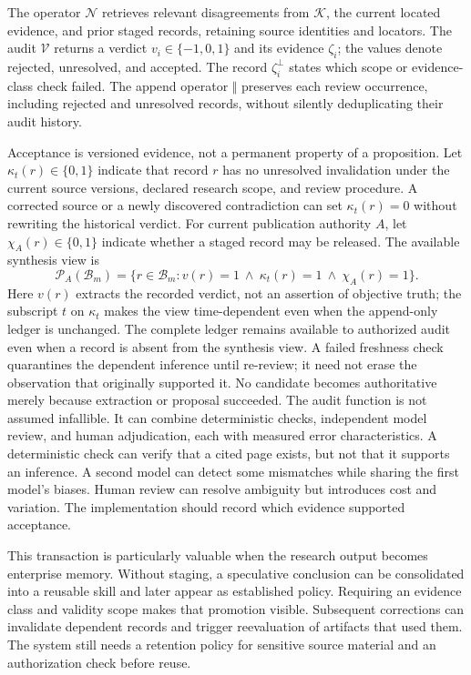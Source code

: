 The operator $\mathcal N$ retrieves relevant disagreements from $\mathcal K$, the current located evidence, and prior staged records, retaining source identities and locators. The audit $\mathcal V$ returns a verdict $v_i\in\{-1,0,1\}$ and its evidence $\zeta_i$; the values denote rejected, unresolved, and accepted. The record $\zeta_i^{\perp}$ states which scope or evidence-class check failed. The append operator $\Vert$ preserves each review occurrence, including rejected and unresolved records, without silently deduplicating their audit history.

Acceptance is versioned evidence, not a permanent property of a proposition. Let $\kappa_t(r)\in\{0,1\}$ indicate that record $r$ has no unresolved invalidation under the current source versions, declared research scope, and review procedure. A corrected source or a newly discovered contradiction can set $\kappa_t(r)=0$ without rewriting the historical verdict. For current publication authority $A$, let $\chi_A(r)\in\{0,1\}$ indicate whether a staged record may be released. The available synthesis view is
\begin{equation}
 \mathcal P_A(\mathcal B_m)=
 \{r\in\mathcal B_m:v(r)=1\ \land\ \kappa_t(r)=1
 \ \land\ \chi_A(r)=1\}.
\label{eq:C24:authorized_evidence_view}
\end{equation}
Here $v(r)$ extracts the recorded verdict, not an assertion of objective truth; the subscript $t$ on $\kappa_t$ makes the view time-dependent even when the append-only ledger is unchanged. The complete ledger remains available to authorized audit even when a record is absent from the synthesis view. A failed freshness check quarantines the dependent inference until re-review; it need not erase the observation that originally supported it. No candidate becomes authoritative merely because extraction or proposal succeeded.
The audit function is not assumed infallible. It can combine deterministic checks, independent model review, and human adjudication, each with measured error characteristics. A deterministic check can verify that a cited page exists, but not that it supports an inference. A second model can detect some mismatches while sharing the first model's biases. Human review can resolve ambiguity but introduces cost and variation. The implementation should record which evidence supported acceptance.

This transaction is particularly valuable when the research output becomes enterprise memory. Without staging, a speculative conclusion can be consolidated into a reusable skill and later appear as established policy. Requiring an evidence class and validity scope makes that promotion visible. Subsequent corrections can invalidate dependent records and trigger reevaluation of artifacts that used them. The system still needs a retention policy for sensitive source material and an authorization check before reuse.

